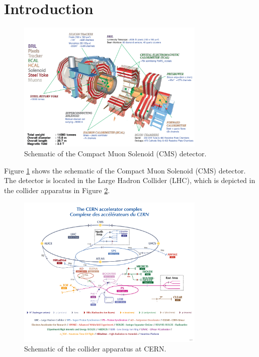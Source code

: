 \section{Introduction}\label{sec:ch3:intro}

 \begin{figure}[h]
\centering
\includegraphics[width=0.8\textwidth]{figures/cms_schematic.png}
\caption{Schematic of the Compact Muon Solenoid (CMS) detector.}
\label{fig:cms}
\end{figure}

Figure \ref{fig:cms} shows the schematic of the Compact Muon Solenoid (CMS) detector. The detector is located in the Large Hadron Collider (LHC), which is depicted in the collider apparatus in Figure \ref{fig:cern}.

 \begin{figure}[h]
\centering
\includegraphics[width=0.8\textwidth]{figures/CCC-v2022.png}
\caption{Schematic of the collider apparatus at CERN.}
\label{fig:cern}
\end{figure}